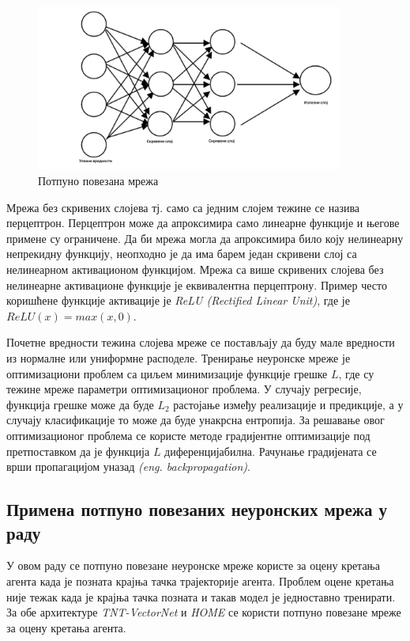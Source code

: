 \documentclass[11pt,oneside]{memoir}
\begin{document}
\begin{figure}[H]
  \centering
  \includegraphics[width=0.9\textwidth]{images/ffn.png}
  \caption{Потпуно повезана мрежа \label{ffn}}
\end{figure}

Мрежа без скривених слојева тј. само са једним слојем тежине се назива перцептрон. Перцептрон може да апроксимира само линеарне функције и 
његове примене су ограничене. Да би мрежа могла да апроксимира било коју нелинеарну непрекидну функцију, неопходно је да има барем
један скривени слој са нелинеарном активационом функцијом. Мрежа са више скривених слојева без нелинеарне активационе функције
је еквивалентна перцептрону. Пример често коришћене
функције активације је \textit{ReLU (Rectified Linear Unit)}, где је $ReLU(x) = max(x, 0)$. 

Почетне вредности тежина слојева мреже се постављају да буду мале вредности из нормалне или униформне расподеле. Тренирање неуронске мреже
је оптимизациони проблем са циљем минимизације функције грешке $L$, где су тежине мреже параметри оптимизационог проблема. У случају регресије, 
функција грешке може да буде $L_2$ растојање између реализације и предикције, а у случају класификације то може да буде унакрсна ентропија.
За решавање овог оптимизационог проблема се користе методе
градијентне оптимизације под претпоставком да је функција $L$ диференцијабилна. 
Рачунање градијената се врши пропагацијом уназад \textit{(eng. backpropagation)}.

\subsection{Примена потпуно повезаних неуронских мрежа у раду}

У овом раду се потпуно повезане неуронске мреже користе за оцену кретања агента када је позната крајња тачка трајекторије агента. Проблем
оцене кретања није тежак када је крајња тачка позната и такав модел је једноставно тренирати. За обе архитектуре 
\textit{TNT-VectorNet} и \textit{HOME} се користи потпуно повезане мреже за оцену кретања агента.
\end{document}
